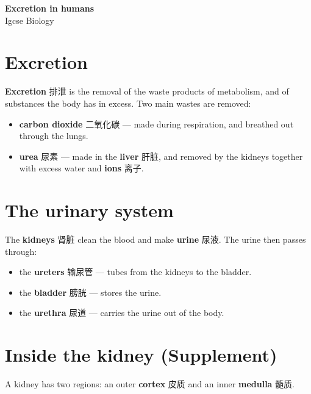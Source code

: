 \documentclass[11pt]{article}
\begin{document}
\begin{center}
  {\LARGE\bfseries Excretion in humans}\\[0.35em]
  {\large Igcse Biology}
\end{center}
\vspace{0.6em}

\section*{Excretion}

\textbf{Excretion} 排泄 is the removal of the waste products of metabolism, and of substances the body has in excess. Two main wastes are removed:

\begin{itemize}
\item \textbf{carbon dioxide} 二氧化碳 — made during respiration, and breathed out through the lungs.

\item \textbf{urea} 尿素 — made in the \textbf{liver} 肝脏, and removed by the kidneys together with excess water and \textbf{ions} 离子.

\end{itemize}

\section*{The urinary system}

The \textbf{kidneys} 肾脏 clean the blood and make \textbf{urine} 尿液. The urine then passes through:

\begin{itemize}
\item the \textbf{ureters} 输尿管 — tubes from the kidneys to the bladder.

\item the \textbf{bladder} 膀胱 — stores the urine.

\item the \textbf{urethra} 尿道 — carries the urine out of the body.

\end{itemize}

\section*{Inside the kidney (Supplement)}

A kidney has two regions: an outer \textbf{cortex} 皮质 and an inner \textbf{medulla} 髓质.
\end{document}
